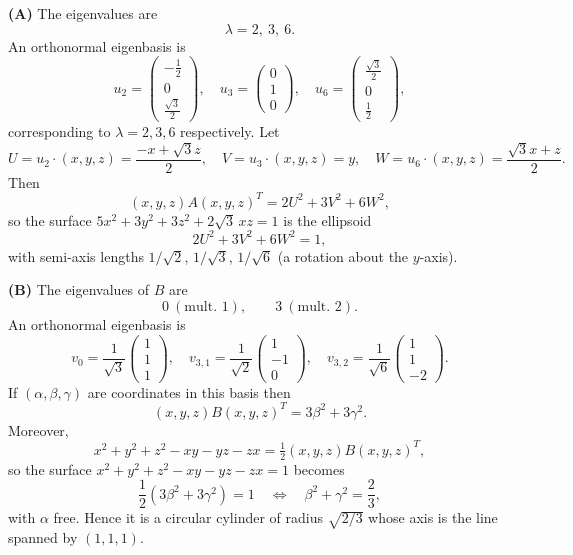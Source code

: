 \begin{solution}
\textbf{(A)} The eigenvalues are
\[
\lambda=2,\ 3,\ 6.
\]
An orthonormal eigenbasis is
\[
u_{2}=\begin{pmatrix}-\tfrac12\\[2pt]0\\[2pt]\tfrac{\sqrt3}{2}\end{pmatrix},\quad
u_{3}=\begin{pmatrix}0\\[2pt]1\\[2pt]0\end{pmatrix},\quad
u_{6}=\begin{pmatrix}\tfrac{\sqrt3}{2}\\[2pt]0\\[2pt]\tfrac12\end{pmatrix},
\]
corresponding to $\lambda=2,3,6$ respectively.
Let
\[
U=u_2\cdot(x,y,z)=\frac{-x+\sqrt3 z}{2},\quad
V=u_3\cdot(x,y,z)=y,\quad
W=u_6\cdot(x,y,z)=\frac{\sqrt3 x+z}{2}.
\]
Then
\[
(x,y,z)A(x,y,z)^T=2U^2+3V^2+6W^2,
\]
so the surface $5x^2+3y^2+3z^2+2\sqrt3\,xz=1$ is the ellipsoid
\[
2U^2+3V^2+6W^2=1,
\]
with semi-axis lengths $1/\sqrt2$, $1/\sqrt3$, $1/\sqrt6$ (a rotation about the $y$-axis).

\textbf{(B)} The eigenvalues of $B$ are
\[
0\ (\text{mult.\ }1),\qquad 3\ (\text{mult.\ }2).
\]
An orthonormal eigenbasis is
\[
v_0=\frac1{\sqrt3}\begin{pmatrix}1\\1\\1\end{pmatrix},\quad
v_{3,1}=\frac1{\sqrt2}\begin{pmatrix}1\\-1\\0\end{pmatrix},\quad
v_{3,2}=\frac1{\sqrt6}\begin{pmatrix}1\\1\\-2\end{pmatrix}.
\]
If $(\alpha,\beta,\gamma)$ are coordinates in this basis then
\[
(x,y,z)B(x,y,z)^T=3\beta^2+3\gamma^2.
\]
Moreover,
\[
x^2+y^2+z^2-xy-yz-zx=\tfrac12(x,y,z)B(x,y,z)^T,
\]
so the surface $x^2+y^2+z^2-xy-yz-zx=1$ becomes
\[
\frac12(3\beta^2+3\gamma^2)=1
\quad\Longleftrightarrow\quad
\beta^2+\gamma^2=\frac23,
\]
with $\alpha$ free. Hence it is a circular cylinder of radius $\sqrt{2/3}$ whose axis is the line spanned by $(1,1,1)$.


\end{solution}
